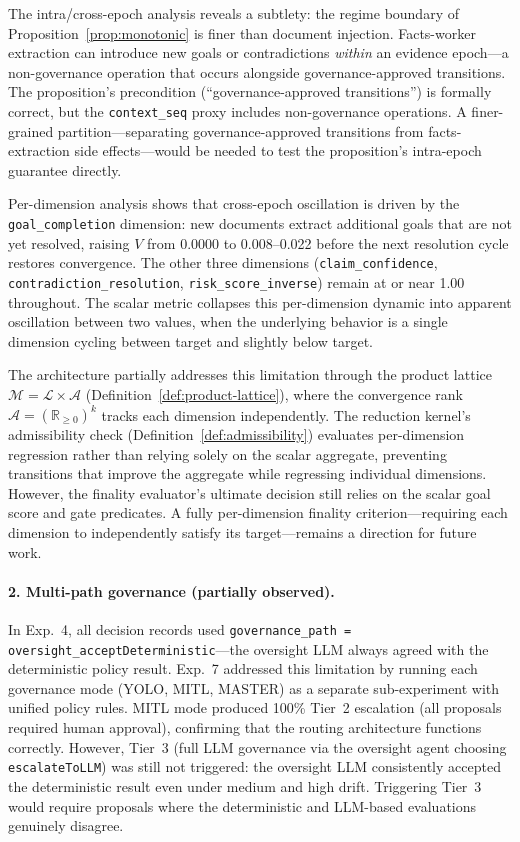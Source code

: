 \documentclass[11pt]{article}
\begin{document}
The intra/cross-epoch analysis reveals a subtlety: the regime boundary of Proposition~\ref{prop:monotonic} is finer than document injection. Facts-worker extraction can introduce new goals or contradictions \emph{within} an evidence epoch---a non-governance operation that occurs alongside governance-approved transitions. The proposition's precondition (``governance-approved transitions'') is formally correct, but the \texttt{context\_seq} proxy includes non-governance operations. A finer-grained partition---separating governance-approved transitions from facts-extraction side effects---would be needed to test the proposition's intra-epoch guarantee directly.

Per-dimension analysis shows that cross-epoch oscillation is driven by the \texttt{goal\_completion} dimension: new documents extract additional goals that are not yet resolved, raising $V$ from 0.0000 to 0.008--0.022 before the next resolution cycle restores convergence. The other three dimensions (\texttt{claim\_confidence}, \texttt{contradiction\_resolution}, \texttt{risk\_score\_inverse}) remain at or near 1.00 throughout. The scalar metric collapses this per-dimension dynamic into apparent oscillation between two values, when the underlying behavior is a single dimension cycling between target and slightly below target.

The architecture partially addresses this limitation through the product lattice $\mathcal{M} = \mathcal{L} \times \mathcal{A}$ (Definition~\ref{def:product-lattice}), where the convergence rank $\mathcal{A} = (\mathbb{R}_{\geq 0})^k$ tracks each dimension independently. The reduction kernel's admissibility check (Definition~\ref{def:admissibility}) evaluates per-dimension regression rather than relying solely on the scalar aggregate, preventing transitions that improve the aggregate while regressing individual dimensions. However, the finality evaluator's ultimate decision still relies on the scalar goal score and gate predicates. A fully per-dimension finality criterion---requiring each dimension to independently satisfy its target---remains a direction for future work.

\paragraph{2. Multi-path governance (partially observed).} In Exp.~4, all decision records used \texttt{governance\_path = oversight\_acceptDeterministic}---the oversight LLM always agreed with the deterministic policy result. Exp.~7 addressed this limitation by running each governance mode (YOLO, MITL, MASTER) as a separate sub-experiment with unified policy rules. MITL mode produced 100\% Tier~2 escalation (all proposals required human approval), confirming that the routing architecture functions correctly. However, Tier~3 (full LLM governance via the oversight agent choosing \texttt{escalateToLLM}) was still not triggered: the oversight LLM consistently accepted the deterministic result even under medium and high drift. Triggering Tier~3 would require proposals where the deterministic and LLM-based evaluations genuinely disagree.
\end{document}
